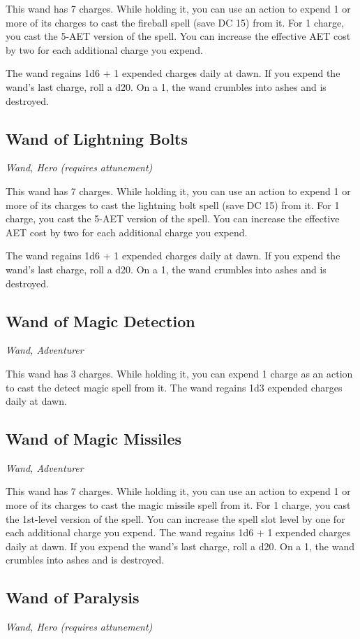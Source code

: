 This wand has 7 charges. While holding it, you can use an action to expend 1 or more of its charges to cast the fireball spell (save DC 15) from it. For 1 charge, you cast the 5-AET version of the spell. You can increase the effective AET cost by two for each additional charge you expend.

The wand regains 1d6 + 1 expended charges daily at dawn. If you expend the wand's last charge, roll a d20. On a 1, the wand crumbles into ashes and is destroyed.

\subsection{Wand of Lightning Bolts}
\textit{Wand, Hero (requires attunement)}

This wand has 7 charges. While holding it, you can use an action to expend 1 or more of its charges to cast the lightning bolt spell (save DC 15) from it. For 1 charge, you cast the 5-AET version of the spell. You can increase the effective AET cost by two for each additional charge you expend.

The wand regains 1d6 + 1 expended charges daily at dawn. If you expend the wand's last charge, roll a d20. On a 1, the wand crumbles into ashes and is destroyed.

\subsection{Wand of Magic Detection}
\textit{Wand, Adventurer}

This wand has 3 charges. While holding it, you can expend 1 charge as an action to cast the detect magic spell from it. The wand regains 1d3 expended charges daily at dawn.

\subsection{Wand of Magic Missiles}
\textit{Wand, Adventurer} 

This wand has 7 charges. While holding it, you can use an action to expend 1 or more of its charges to cast the magic missile spell from it. For 1 charge, you cast the 1st-level version of the spell. You can increase the spell slot level by one for each additional charge you expend. The wand regains 1d6 + 1 expended charges daily at dawn. If you expend the wand's last charge, roll a d20. On a 1, the wand crumbles into ashes and is destroyed.

\subsection{Wand of Paralysis}
\textit{Wand, Hero (requires attunement)} 

